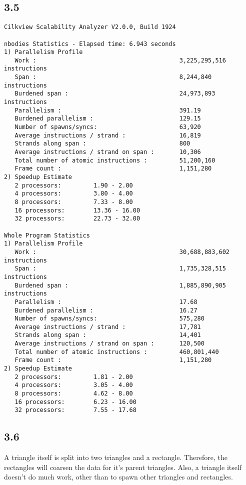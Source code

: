 \documentclass[12pt]{article}
\begin{document}
\subsection{3.5}
\begin{verbatim}
Cilkview Scalability Analyzer V2.0.0, Build 1924

nbodies Statistics - Elapsed time: 6.943 seconds
1) Parallelism Profile
   Work :                                        3,225,295,516 instructions
   Span :                                        8,244,840 instructions
   Burdened span :                               24,973,893 instructions
   Parallelism :                                 391.19
   Burdened parallelism :                        129.15
   Number of spawns/syncs:                       63,920
   Average instructions / strand :               16,819
   Strands along span :                          800
   Average instructions / strand on span :       10,306
   Total number of atomic instructions :         51,200,160
   Frame count :                                 1,151,280
2) Speedup Estimate
   2 processors:         1.90 - 2.00
   4 processors:         3.80 - 4.00
   8 processors:         7.33 - 8.00
   16 processors:        13.36 - 16.00
   32 processors:        22.73 - 32.00

Whole Program Statistics
1) Parallelism Profile
   Work :                                        30,688,883,602 instructions
   Span :                                        1,735,328,515 instructions
   Burdened span :                               1,885,890,905 instructions
   Parallelism :                                 17.68
   Burdened parallelism :                        16.27
   Number of spawns/syncs:                       575,280
   Average instructions / strand :               17,781
   Strands along span :                          14,401
   Average instructions / strand on span :       120,500
   Total number of atomic instructions :         460,801,440
   Frame count :                                 1,151,280
2) Speedup Estimate
   2 processors:         1.81 - 2.00
   4 processors:         3.05 - 4.00
   8 processors:         4.62 - 8.00
   16 processors:        6.23 - 16.00
   32 processors:        7.55 - 17.68
\end{verbatim}

\subsection{3.6}
A triangle itself is split into two triangles and a rectangle.  Therefore, the 
rectangles will coarsen the data for it's parent triangles.  Also, a triangle 
itself doesn't do much work, other than to spawn other triangles and rectangles.  
\end{document}
